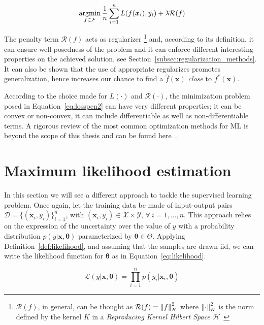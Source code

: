 \begin{equation} \label{eq:losspen2}
	\mathop{\mathrm{argmin}}\limits_{f \in \mathcal{F}}{\frac{1}{n} \sum_{i=1}^{n} L(f(\bm{x}_i), y_i)} + \lambda \mathcal{R}(f)
\end{equation}

The penalty term $\mathcal{R}(f)$ acts as regularizer \footnote{$\mathcal{R}(f)$, in general, can be thought as $\mathcal{R}(f) = \left\lVert f\right\rVert^2_K$ where $\left\lVert\cdot\right\rVert^2_K$ is the norm defined by the kernel $K$ in a \textit{Reproducing Kernel Hilbert Space} $\mathcal{H}$~\cite{evgeniou2000regularization}}
and, according to its definition, it can ensure well-posedness of the problem and it can enforce different interesting properties on the achieved solution, see Section~\ref{subsec:regularization_methods}. It can also be shown that the use of appropriate regularizes promotes generalization, hence increases our chance to find a $\hat f(\bm{x})$ \textit{close} to $f^*(\bm{x})$.

 According to the choice made for $L(\cdot)$ and $\mathcal{R}(\cdot)$, the minimization problem posed in Equation~\eqref{eq:losspen2} can have very different properties; it can be convex or non-convex, it can include differentiable as well as non-differentiable terms. A rigorous review of the most common optimization methods for ML is beyond the scope of this thesis and can be found here~\cite{boyd2004convex, bach2012optimization, sra2012optimization, nesterov2013introductory}.


\section{Maximum likelihood  estimation} \label{sec:mle}
In this section we will see a different approach to tackle the supervised learning problem.
Once again, let the training data be made of input-output pairs $\mathcal{D} = \{(\bm{x}_i, y_i)\}_{i=1}^n$, with $(\bm{x}_i,y_i) \in \mathcal{X} \times \mathcal{Y}$, $\forall~i=1,\dots,n$. This approach relies on the expression of the uncertainty over the value of $y$ with a probability distribution $p(y|\bm{x},\bm{\theta})$ parameterized by $\bm{\theta} \in \Theta$.
Applying Definition~\ref{def:likelihood}, and assuming that the samples are drawn \ac{iid}, we can write the likelihood function for $\bm{\theta}$ as in Equation~\eqref{eq:likelihood}.

\begin{equation} \label{eq:likelihood}
	\mathcal{L}(y|\bm{x}, \bm{\theta}) = \prod_{i=1}^{n} p(y_i | \bm{x}_i , \bm{\theta})
\end{equation}

